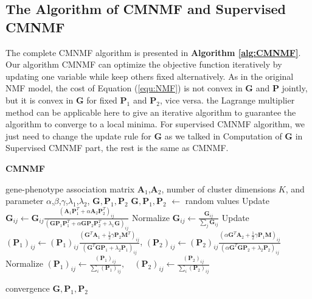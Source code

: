 \documentclass{bmcart}
\begin{document}
\subsection*{\textbf{The Algorithm of CMNMF and Supervised CMNMF}}
The complete CMNMF algorithm is presented in \textbf{Algorithm \ref{alg:CMNMF}}. Our algorithm CMNMF can optimize the objective function iteratively by updating one variable while keep others fixed alternatively. As in the original NMF model, the cost of Equation (\ref{equ:NMF}) is not convex in $\bm{G}$ and $\bm{P}$ jointly, but it is convex in $\bm{G}$ for fixed $\bm{P}_1$ and $\bm{P}_2$, vice versa. the Lagrange multiplier method can be applicable here to give an iterative algorithm to guarantee the algorithm to converge to a local minima\cite{Zunyan2014}. For supervised CMNMF algorithm, we just need to change the update rule for $\bm{G}$ as we talked in \textup{Computation of $\bm{G}$ in Supervised CMNMF} part, the rest is the same as CMNMF.
\begin{algorithm}[t]
\caption{\textbf{CMNMF}}\label{alg:CMNMF}
\renewcommand{\algorithmicrequire}{\textbf{Input:}}
\renewcommand{\algorithmicensure}{\textbf{Output:}}
\label{alg:pf}
\begin{algorithmic}[1]
\REQUIRE gene-phenotype association matrix $\bm{A}_1$,$\bm{A}_2$, number of cluster dimensions $K$, and parameter $\alpha$,$\beta$,$\gamma$,$\lambda_1$,$\lambda_2$,
\ENSURE {} ${\bm{G}}, {\bm{P}_1},{\bm{P}_2}$
\STATE ${\bm{G}},{\bm{P}_1},{\bm{P}_2}$ $\leftarrow$ random values
\REPEAT
    \STATE Update $\bm{G}_{ij}\leftarrow \bm{G}_{ij}\frac{(\bm{A}_1\bm{P}_1^T+\alpha \bm{A}_2\bm{P}_2^T)_{ij}}{(\bm{G}\bm{P}_1\bm{P}_1^T+\alpha \bm{G}\bm{P}_2\bm{P}_2^T+\lambda_1\bm{G})_{ij}}$
    \STATE Normalize $\bm{G}_{ij}\leftarrow \frac{\bm{G}_{ij}}{\sum_{j}\bm{G}_{ij}}$
    \STATE Update $(\bm{P}_1)_{ij}\leftarrow (\bm{P}_1)_{ij}\frac{(\bm{G}^T\bm{A}_1+\frac{1}{2}\gamma \bm{P}_2\bm{M}^T)_{ij}}{(\bm{G}^T\bm{G}\bm{P}_1+\lambda_2\bm{P}_1)_{ij}}$,
    $(\bm{P}_2)_{ij}\leftarrow (\bm{P}_2)_{ij}\frac{(\alpha \bm{G}^T\bm{A}_2+\frac{1}{2}\gamma \bm{P}_1\bm{M})_{ij}}
{(\alpha \bm{G}^T\bm{G}\bm{P}_2 + \lambda_2\bm{P}_2)_{ij}}$
    \STATE Normalize $(\bm{P}_1)_{ij}\leftarrow \frac{(\bm{P}_1)_{ij}}{\sum_{i}(\bm{P}_1)_{ij}}, \quad
(\bm{P}_2)_{ij}\leftarrow \frac{(\bm{P}_2)_{ij}}{\sum_{i}(\bm{P}_2)_{ij}}$

\UNTIL convergence
\RETURN ${\bm{G}},{\bm{P}_1},{\bm{P}_2}$
\end{algorithmic}
\end{algorithm}
\end{document}
